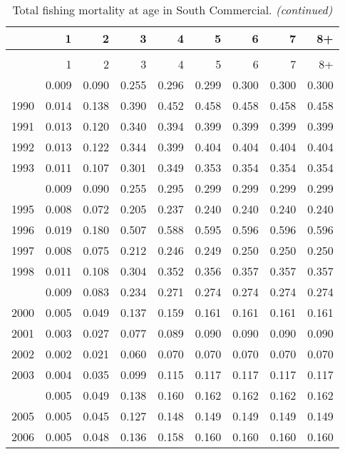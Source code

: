 \documentclass[
]{article}
\begin{document}
\begin{longtable}[t]{lrrrrrrrr}
\caption{\label{tab:South_Commercial-fleet-FAA-table}Total fishing mortality at age in South Commercial.}\\
\toprule
  & 1 & 2 & 3 & 4 & 5 & 6 & 7 & 8+\\
\midrule
\endfirsthead
\caption[]{Total fishing mortality at age in South Commercial. \textit{(continued)}}\\
\toprule
  & 1 & 2 & 3 & 4 & 5 & 6 & 7 & 8+\\
\midrule
\endhead

\endfoot
\bottomrule
\endlastfoot
1989 & 0.009 & 0.090 & 0.255 & 0.296 & 0.299 & 0.300 & 0.300 & 0.300\\
1990 & 0.014 & 0.138 & 0.390 & 0.452 & 0.458 & 0.458 & 0.458 & 0.458\\
1991 & 0.013 & 0.120 & 0.340 & 0.394 & 0.399 & 0.399 & 0.399 & 0.399\\
1992 & 0.013 & 0.122 & 0.344 & 0.399 & 0.404 & 0.404 & 0.404 & 0.404\\
1993 & 0.011 & 0.107 & 0.301 & 0.349 & 0.353 & 0.354 & 0.354 & 0.354\\
\addlinespace
1994 & 0.009 & 0.090 & 0.255 & 0.295 & 0.299 & 0.299 & 0.299 & 0.299\\
1995 & 0.008 & 0.072 & 0.205 & 0.237 & 0.240 & 0.240 & 0.240 & 0.240\\
1996 & 0.019 & 0.180 & 0.507 & 0.588 & 0.595 & 0.596 & 0.596 & 0.596\\
1997 & 0.008 & 0.075 & 0.212 & 0.246 & 0.249 & 0.250 & 0.250 & 0.250\\
1998 & 0.011 & 0.108 & 0.304 & 0.352 & 0.356 & 0.357 & 0.357 & 0.357\\
\addlinespace
1999 & 0.009 & 0.083 & 0.234 & 0.271 & 0.274 & 0.274 & 0.274 & 0.274\\
2000 & 0.005 & 0.049 & 0.137 & 0.159 & 0.161 & 0.161 & 0.161 & 0.161\\
2001 & 0.003 & 0.027 & 0.077 & 0.089 & 0.090 & 0.090 & 0.090 & 0.090\\
2002 & 0.002 & 0.021 & 0.060 & 0.070 & 0.070 & 0.070 & 0.070 & 0.070\\
2003 & 0.004 & 0.035 & 0.099 & 0.115 & 0.117 & 0.117 & 0.117 & 0.117\\
\addlinespace
2004 & 0.005 & 0.049 & 0.138 & 0.160 & 0.162 & 0.162 & 0.162 & 0.162\\
2005 & 0.005 & 0.045 & 0.127 & 0.148 & 0.149 & 0.149 & 0.149 & 0.149\\
2006 & 0.005 & 0.048 & 0.136 & 0.158 & 0.160 & 0.160 & 0.160 & 0.160\\

\end{longtable}
\end{document}
